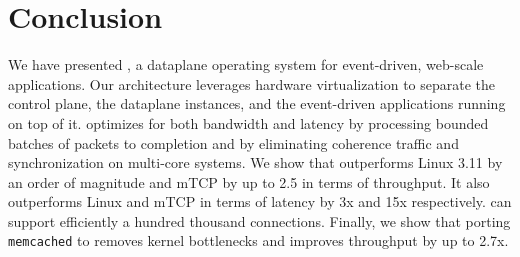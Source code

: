 
\section{Conclusion}

We have presented \ix, a dataplane operating system for event-driven,
web-scale applications.  Our architecture leverages hardware
virtualization to separate the control plane, the \ix dataplane
instances, and the event-driven applications running on top of it.
\ix optimizes for both bandwidth and latency by processing bounded
batches of packets to completion and by eliminating coherence traffic
and synchronization on multi-core systems. We show that \ix
outperforms Linux 3.11 by an order of magnitude and mTCP by up to 2.5
in terms of throughput. It also outperforms Linux and mTCP in terms of
latency by 3x and 15x respectively. \ix can support efficiently a
hundred thousand connections. Finally, we show that porting
\texttt{memcached} to \ix removes kernel bottlenecks and improves
throughput by up to 2.7x.


